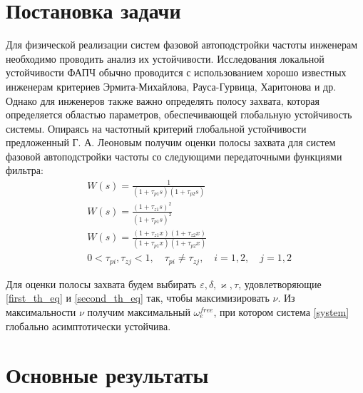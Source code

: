 \documentclass[a4paper,article,14pt]{extarticle}
\begin{document}

\newpage
\section{Постановка задачи}
Для физической реализации систем фазовой автоподстройки частоты инженерам необходимо проводить анализ их устойчивости. Исследования локальной устойчивости ФАПЧ обычно проводится с использованием хорошо известных инженерам критериев Эрмита-Михайлова, Рауса-Гурвица, Харитонова и др. Однако для инженеров также важно определять полосу захвата, которая определяется областью параметров, обеспечивающей глобальную устойчивость системы. Опираясь на частотный критерий глобальной устойчивости предложенный Г. А. Леоновым получим оценки полосы захвата для систем фазовой автоподстройки частоты со следующими передаточными функциями фильтра: 
 \begin{align}
&W(s) = \frac{1}{(1+\tau_{p1}s)(1+\tau_{p2}s)}\\[5pt]
&W(s) = \frac{(1+\tau_{z1}s)^2}{(1+\tau_{p1}s)^2}\\[5pt]
&W(s) = \frac{(1+\tau_{z1}x)(1+\tau_{z2}x)}{(1+\tau_{p1}x)(1+\tau_{p2}x)}\\
&0<\tau_{pi},\tau_{zj} < 1, \quad \tau_{pi} \neq \tau_{zj}, \quad i=1,2, \quad j=1,2
 \end{align}
 
 Для оценки полосы захвата будем выбирать $\varepsilon, \delta, \varkappa, \tau$, удовлетворяющие \eqref{first_th_eq} и \eqref{second_th_eq} так, чтобы максимизировать $\nu$. Из максимальности $\nu$ получим максимальный $\omega_e^{free}$, при котором система \eqref{system} глобально асимптотически устойчива.
 

\pagebreak
\section{Основные результаты}
\end{document}

